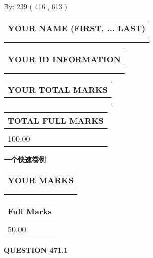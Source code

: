 \documentclass{ctexart}
\begin{document}
   
\hspace{1.0in} By: 
 239 ( 416 ,  613 )
   
   
   
   
\newpage 
\setcounter{page}{ 
   471001 } 
   
   
   
   
\noindent\begin{tabular}{|l|}
\hline
YOUR NAME (FIRST, ... LAST)  \\
\hline
 \\ 
 \\ 
\hline
\end{tabular}
\hspace{0.05in} \begin{tabular}{|l|}
\hline
 YOUR   ID   INFORMATION  \\
\hline
 \\ 
 \\ 
\hline
\end{tabular}
   
   
\vspace{0.2in}\noindent\begin{tabular}{|l|}
\hline
YOUR TOTAL MARKS  \\
\hline
 \\ 
 \\ 
\hline
\end{tabular}
\hspace{0.05in} \begin{tabular}{|l|}
\hline
TOTAL FULL MARKS  \\
\hline
 \\ 
100.00 \\
\hline
\end{tabular}
   
   
 \vspace{0.2in}
{\LARGE {\textbf{ 一个快速卷例}}}
   
   
  
\vspace{0.2in}
  
\noindent\begin{tabular}{|l|}
\hline
 YOUR MARKS  \\
\hline
 \\ 
 \\ 
\hline
\end{tabular}
\hspace{0.05in} \begin{tabular}{|l|}
\hline
 Full Marks  \\
\hline
 \\ 
50.00 \\
\hline
\end{tabular}
{\textbf{\Large{QUESTION
471.1 
}}}
  
\end{document}
